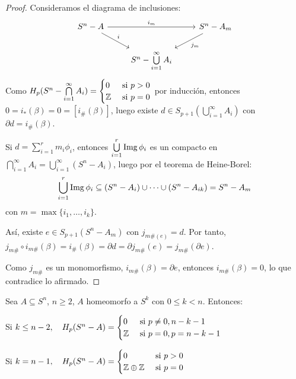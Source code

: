 \begin{proof}
  Consideramos el diagrama de inclusiones:
  \[ \begin{tikzcd}
    S^n - A \arrow{dr}{i} \arrow{rr}{i_m} & & S^n - A_m \arrow{dl}{j_m} \\
    & S^n - \bigcup\limits_{i = 1}^\infty A_i
  \end{tikzcd} \]
  Como $H_p(S^n - \bigcap\limits_{i = 1}^\infty A_i) = \begin{cases} 0 &\text{ si } p > 0 \\ \mathbb{Z} &\text{ si } p = 0 \end{cases}$ por inducción, entonces \\
  $0 = i_*(\beta) = 0 = [i_\#(\beta)]$, luego existe $d \in S_{p+1}(\bigcup\limits_{i = 1}^\infty A_i)$ con $\partial d = i_\#(\beta)$.

  Si $d = \sum\limits_{i = 1}^r m_i \phi_i$, entonces $\bigcup\limits_{i = 1}^r \operatorname{Img} \phi_i$ es un compacto en $\bigcap\limits_{i = 1}^\infty A_i
  = \bigcup\limits_{i = 1}^\infty (S^n - A_i)$, luego por el teorema de Heine-Borel:
  \[\bigcup\limits_{i = 1}^r \operatorname{Img} \phi_i \subseteq (S^n - A_i) \cup \dots \cup (S^n - A_{ik}) = S^n - A_m \]
  con $m = \max\{i_1, \dots, i_k\}$.

  Así, existe $e \in S_{p+1}(S^n - A_m)$ con $j_{m\#(e)} = d$. Por tanto, $j_{m\#} \circ i_{m\#} (\beta) = i_\#(\beta) = \partial d
  = \partial j_{m\#}(e) = j_{m\#}(\partial e)$.

  Como $j_{m\#}$ es un monomorfismo, $i_{m\#}(\beta) = \partial e$, entonces $i_{m\#}(\beta) = 0$, lo que contradice lo afirmado.
\end{proof}

\begin{theorem}
  Sea $A \subseteq S^n$, $n \geq 2$, $A$ homeomorfo a $S^k$ con $0 \leq k < n$. Entonces:

  Si $k \leq n-2, \quad H_p(S^n - A) = \begin{cases} 0 &\text{ si } p \neq 0, n-k-1 \\ \mathbb{Z} &\text{ si } p = 0, p = n-k-1 \end{cases}$

  Si $k = n-1, \quad    H_p(S^n - A) = \begin{cases} 0 &\text{ si } p > 0 \\ \mathbb{Z} \oplus \mathbb{Z} &\text{ si } p = 0 \end{cases}$
\end{theorem}

